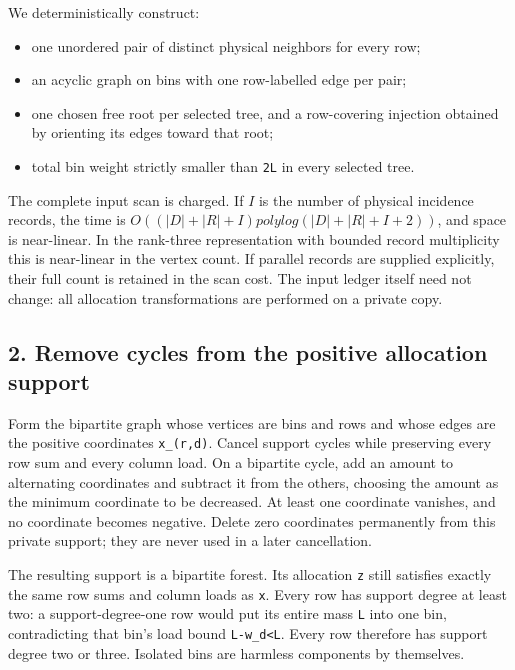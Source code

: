 We deterministically construct:

\begin{itemize}
\tightlist
\item
  one unordered pair of distinct physical neighbors for every row;
\item
  an acyclic graph on bins with one row-labelled edge per pair;
\item
  one chosen free root per selected tree, and a row-covering injection obtained by orienting its edges toward that root;
\item
  total bin weight strictly smaller than \texttt{2L} in every selected tree.
\end{itemize}

The complete input scan is charged. If \(I\) is the number of physical incidence records, the time is \(O((|D|+|R|+I) polylog(|D|+|R|+I+2))\), and space is near-linear. In the rank-three representation with bounded record multiplicity this is near-linear in the vertex count. If parallel records are supplied explicitly, their full count is retained in the scan cost. The input ledger itself need not change: all allocation transformations are performed on a private copy.

\hypertarget{af-c467a6f0ad-remove-cycles-from-the-positive-allocation-support}{%
\subsection{2. Remove cycles from the positive allocation support}\label{af-c467a6f0ad-remove-cycles-from-the-positive-allocation-support}}

Form the bipartite graph whose vertices are bins and rows and whose edges are the positive coordinates \texttt{x\_(r,d)}. Cancel support cycles while preserving every row sum and every column load. On a bipartite cycle, add an amount to alternating coordinates and subtract it from the others, choosing the amount as the minimum coordinate to be decreased. At least one coordinate vanishes, and no coordinate becomes negative. Delete zero coordinates permanently from this private support; they are never used in a later cancellation.

The resulting support is a bipartite forest. Its allocation \texttt{z} still satisfies exactly the same row sums and column loads as \texttt{x}. Every row has support degree at least two: a support-degree-one row would put its entire mass \texttt{L} into one bin, contradicting that bin's load bound \texttt{L-w\_d\textless{}L}. Every row therefore has support degree two or three. Isolated bins are harmless components by themselves.


